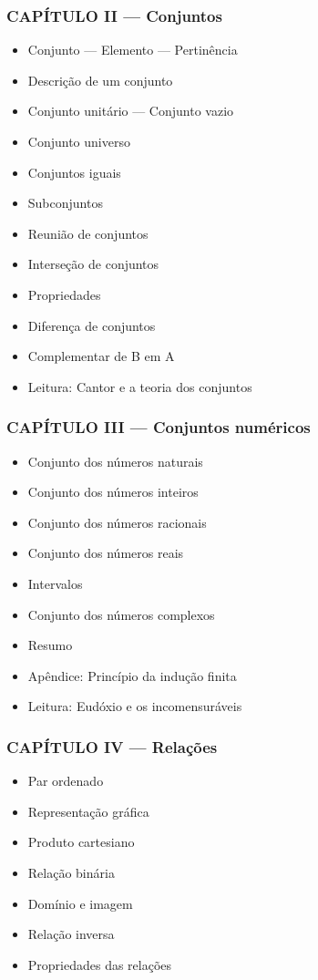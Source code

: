 \documentclass[a4paper,12pt]{article}[abntex2]
\begin{document}
\subsubsection*{CAPÍTULO II — Conjuntos}

\begin{itemize}
\item Conjunto — Elemento — Pertinência
\item Descrição de um conjunto
\item Conjunto unitário — Conjunto vazio
\item Conjunto universo
\item Conjuntos iguais
\item Subconjuntos
\item Reunião de conjuntos
\item Interseção de conjuntos
\item Propriedades
\item Diferença de conjuntos
\item Complementar de B em A
\item Leitura: Cantor e a teoria dos conjuntos
\end{itemize}
\subsubsection*{CAPÍTULO III — Conjuntos numéricos}

\begin{itemize}
\item Conjunto dos números naturais
\item Conjunto dos números inteiros
\item Conjunto dos números racionais
\item Conjunto dos números reais
\item Intervalos
\item Conjunto dos números complexos
\item Resumo
\item Apêndice: Princípio da indução finita
\item Leitura: Eudóxio e os incomensuráveis
\end{itemize}
\subsubsection*{CAPÍTULO IV — Relações}

\begin{itemize}
\item Par ordenado
\item Representação gráfica
\item Produto cartesiano
\item Relação binária
\item Domínio e imagem
\item Relação inversa
\item Propriedades das relações
\end{itemize}
\end{document}
